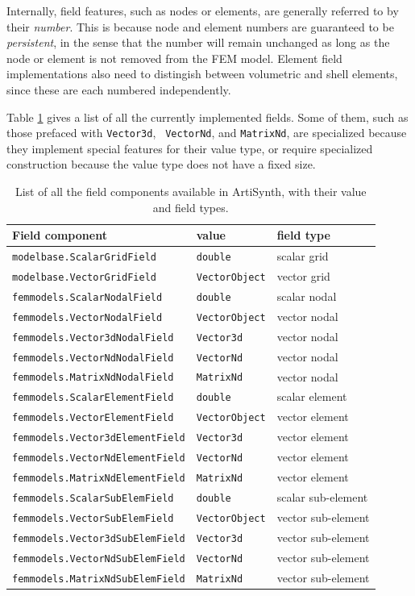 Internally, field features, such as nodes or elements, are generally
referred to by their {\it number}. This is because node and element
numbers are guaranteed to be {\it persistent}, in the sense that the
number will remain unchanged as long as the node or element is not
removed from the FEM model. Element field implementations also need to
distingish between volumetric and shell elements, since these are each
numbered independently.

Table \ref{Fields:tab} gives a list of all the currently implemented
fields. Some of them, such as those prefaced with {\tt Vector3d}, {\tt
VectorNd}, and {\tt MatrixNd}, are specialized because they
implement special features for their value type, or require
specialized construction because the value type does not have a fixed
size.

\begin{table}
\begin{center}
\begin{tabular}{|lll|}
\hline
Field component & value & field type \\
\hline
{\tt modelbase.ScalarGridField} & {\tt double} & scalar grid \\
{\tt modelbase.VectorGridField} & {\tt VectorObject} & vector grid \\
{\tt femmodels.ScalarNodalField} & {\tt double} & scalar nodal \\
{\tt femmodels.VectorNodalField} & {\tt VectorObject} & vector nodal \\
{\tt femmodels.Vector3dNodalField} & {\tt Vector3d} & vector nodal \\
{\tt femmodels.VectorNdNodalField} & {\tt VectorNd} & vector nodal \\
{\tt femmodels.MatrixNdNodalField} & {\tt MatrixNd} & vector nodal \\
{\tt femmodels.ScalarElementField} & {\tt double} & scalar element \\
{\tt femmodels.VectorElementField} & {\tt VectorObject} & vector element \\
{\tt femmodels.Vector3dElementField} & {\tt Vector3d} & vector element \\
{\tt femmodels.VectorNdElementField} & {\tt VectorNd} & vector element \\
{\tt femmodels.MatrixNdElementField} & {\tt MatrixNd} & vector element \\
{\tt femmodels.ScalarSubElemField} & {\tt double} & scalar sub-element \\
{\tt femmodels.VectorSubElemField} & {\tt VectorObject} & vector sub-element \\
{\tt femmodels.Vector3dSubElemField} & {\tt Vector3d} & vector sub-element \\
{\tt femmodels.VectorNdSubElemField} & {\tt VectorNd} & vector sub-element \\
{\tt femmodels.MatrixNdSubElemField} & {\tt MatrixNd} & vector sub-element \\
\hline
\end{tabular}
\end{center}
\caption{List of all the field components available in ArtiSynth, with
their value and field types.}
\label{Fields:tab}
\end{table}

